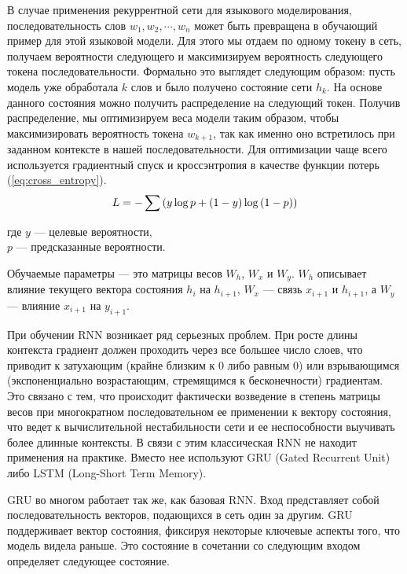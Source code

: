 В случае применения рекуррентной сети для языкового моделирования, последовательность слов $w_1, w_2, \cdots, w_n$ может быть превращена в обучающий пример для этой языковой модели. Для этого мы отдаем по одному токену в сеть, получаем вероятности следующего и максимизируем вероятность следующего токена последовательности. Формально это выглядет следующим образом: пусть модель уже обработала $k$ слов и было получено состояние сети $h_k$. На основе данного состояния можно получить распределение на следующий токен. Получив распределение, мы оптимизируем веса модели таким образом, чтобы максимизировать вероятность токена $w_{k+1}$, так как именно оно встретилось при заданном контексте в нашей последовательности. Для оптимизации чаще всего используется градиентный спуск и кроссэнтропия в качестве функции потерь (\ref{eq:cross_entropy}).
\begin{equation}
	\mathnormal{L} = -\sum{(y\log{p} + (1 - y)\log{(1-p)})}
	\label{eq:cross_entropy}
\end{equation}
\begin{explanation}
	где $y$ --- целевые вероятности, \\
	$p$ --- предсказанные вероятности.
\end{explanation}

Обучаемые параметры — это матрицы весов $W_h$, $W_x$ и $W_y$. $W_h$ описывает влияние текущего вектора состояния $h_i$ на $h_{i+1}$, $W_x$ --- связь $x_{i+1}$ и $h_{i+1}$, а $W_y$ --- влияние $x_{i+1}$ на $y_{i+1}$.

При обучении RNN возникает ряд серьезных проблем. При росте длины контекста градиент должен проходить через все большее число слоев, что приводит к затухающим (крайне близким к 0 либо равным 0) или взрывающимся
(экспоненциально возрастающим, стремящимся к бесконечности) градиентам. Это связано с тем, что происходит фактически возведение в степень матрицы весов при многократном последовательном ее применении к вектору состояния, что ведет к вычислительной нестабильности сети и ее неспособности выучивать более длинные контексты. В связи с этим классическая RNN не находит применения на практике. Вместо нее используют GRU (Gated Recurrent Unit) либо LSTM (Long-Short Term Memory).

GRU во многом работает так же, как базовая RNN. Вход представляет собой последовательность векторов, подающихся в сеть один за другим. GRU поддерживает вектор состояния, фиксируя некоторые ключевые аспекты того, что модель видела раньше. Это состояние в сочетании со следующим входом определяет следующее состояние. ~\cite{neural_lms}

